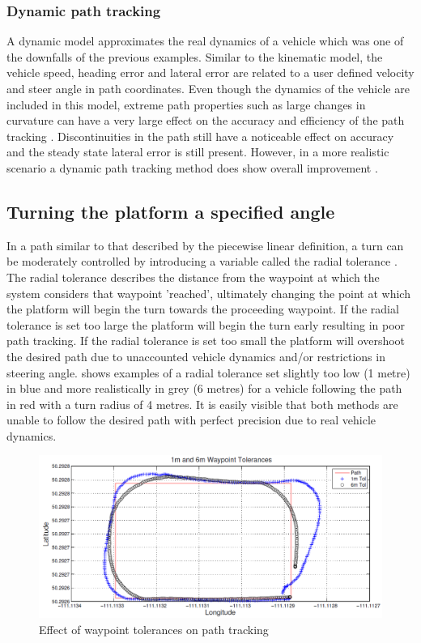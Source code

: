 \documentclass[main.tex]{subfiles}
\begin{document}
\subsubsection{Dynamic path tracking}
A dynamic model approximates the real dynamics of a vehicle which was one of the downfalls of the previous examples. Similar to the kinematic model, the vehicle speed, heading error and lateral error are related to a user defined velocity and steer angle in path coordinates. Even though the dynamics of the vehicle are included in this model, extreme path properties such as large changes in curvature can have a very large effect on the accuracy and efficiency of the path tracking \parencite{snider2009}. Discontinuities in the path still have a noticeable effect on accuracy and the steady state lateral error is still present. However, in a more realistic scenario a dynamic path tracking method does show overall improvement \parencite{snider2009}.

\subsection{Turning the platform a specified angle}
In a path similar to that described by the piecewise linear definition, a turn can be moderately controlled by introducing a variable called the radial tolerance \parencite{Giesbrecht2005}. The radial tolerance describes the distance from the waypoint at which the system considers that waypoint 'reached', ultimately changing the point at which the platform will begin the turn towards the proceeding waypoint. If the radial tolerance is set too large the platform will begin the turn early resulting in poor path tracking. If the radial tolerance is set too small the platform will overshoot the desired path due to unaccounted vehicle dynamics and/or restrictions in steering angle.  shows examples of a radial tolerance set slightly too low (1 metre) in blue and more realistically in grey (6 metres) for a vehicle following the path in red with a turn radius of 4 metres. It is easily visible that both methods are unable to follow the desired path with perfect precision due to real vehicle dynamics.
\begin{figure}[ht]
\includegraphics[width=\textwidth]{2-LiteratureReview/waypointTolerances.PNG}
\centering
\caption[Effect of waypoint tolerances on path tracking]{Effect of waypoint tolerances on path tracking \parencite{Giesbrecht2005}} 
\end{figure}
\end{document}
